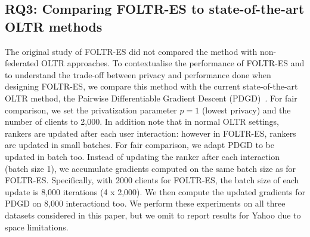 


\subsection{RQ3: Comparing FOLTR-ES to state-of-the-art OLTR methods}
The original study of FOLTR-ES did not compared the method with non-federated OLTR approaches. To contextualise the performance of FOLTR-ES and to understand the trade-off between privacy and performance done when designing FOLTR-ES, we compare this method with the current state-of-the-art OLTR method, the Pairwise Differentiable Gradient Descent (PDGD)~\cite{oosterhuis2018differentiable}. For fair comparison, we set the privatization parameter $p=1$ (lowest privacy) and the number of clients to 2,000. In addition note that in normal OLTR settings, rankers are updated after each user interaction: however in FOLTR-ES, rankers are updated in small batches. For fair comparison, we adapt PDGD to be updated in batch too. Instead of updating the ranker after each interaction (batch size 1), we accumulate gradients computed on the same batch size as for FOLTR-ES. Specifically, with 2000 clients for FOLTR-ES, the batch size of each update is 8,000 iterations (4 x 2,000). We then compute the updated gradients for PDGD on 8,000 interactiond too. %
We perform these experiments on all three datasets considered in this paper, but we omit to report results for Yahoo due to space limitations. 

